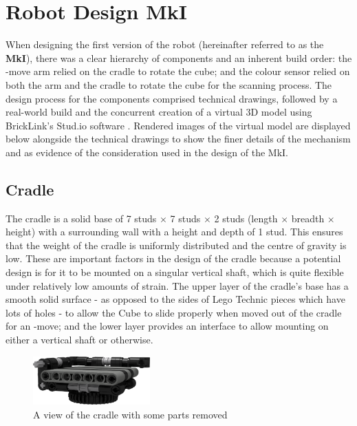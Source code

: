 \documentclass{report}
\newcommand{\tbo}[1]{\textbf{#1}}
\newcommand{\move}[1]{\uppercase{\texttt{\formatmovesnospace{#1}}}-move}
\begin{document}
    \section{Robot Design MkI}
    
	When designing the first version of the robot (hereinafter referred to as the \tbo{MkI}), there was a clear hierarchy of components and an inherent build order: the \move{x} arm relied on the cradle to rotate the cube; and the colour sensor relied on both the arm and the cradle to rotate the cube for the scanning process. The design process for the components comprised technical drawings, followed by a real-world build and the concurrent creation of a virtual 3D model using BrickLink's Stud.io software \cite{BrickLink2016}. Rendered images of the virtual model are displayed below alongside the technical drawings to show the finer details of the mechanism and as evidence of the consideration used in the design of the MkI.
    
	\subsection{Cradle}
	
	The cradle is a solid base of 7 studs $\times$ 7 studs $\times$ 2 studs (length $\times$ breadth $\times$ height) with a surrounding wall with a height and depth of 1 stud. This ensures that the weight of the cradle is uniformly distributed and the centre of gravity is low. These are important factors in the design of the cradle because a potential design is for it to be mounted on a singular vertical shaft, which is quite flexible under relatively low amounts of strain. The upper layer of the cradle's base has a smooth solid surface - as opposed to the sides of Lego Technic pieces which have lots of holes - to allow the Cube to slide properly when moved out of the cradle for an \move{x}; and the lower layer provides an interface to allow mounting on either a vertical shaft or otherwise.
	
	\begin{figure}[H]
		\centering
		\includegraphics[width=0.4\textwidth]{Resources/Images/rdrCradle.png}
		\caption{A view of the cradle with some parts removed}
		\label{fig:rdrCradle}
	\end{figure}
	
\end{document}
